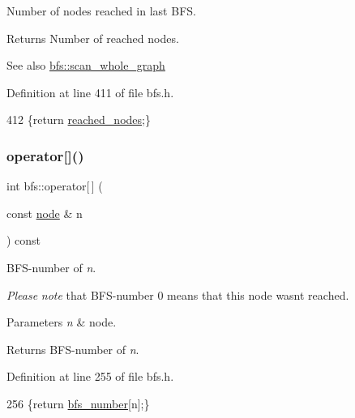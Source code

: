 Number of nodes reached in last B\+FS. 

\begin{DoxyReturn}{Returns}
Number of reached nodes. 
\end{DoxyReturn}
\begin{DoxySeeAlso}{See also}
\mbox{\hyperlink{classbfs_a25fc51b1bfbbdd3afefe0a84c1bd2f6b}{bfs\+::scan\+\_\+whole\+\_\+graph}} 
\end{DoxySeeAlso}


Definition at line 411 of file bfs.\+h.


\begin{DoxyCode}
412     \{\textcolor{keywordflow}{return} \mbox{\hyperlink{classbfs_ac3db80b59d5db049199936445a6c2da8}{reached\_nodes}};\}
\end{DoxyCode}
\mbox{\label{classbfs_addc2a3d0a275007455d22f6b76830e66}} 
\subsubsection{\texorpdfstring{operator[]()}{operator[]()}}
{\footnotesize\ttfamily int bfs\+::operator\mbox{[}$\,$\mbox{]} (\begin{DoxyParamCaption}\item[{const \mbox{\hyperlink{classnode}{node}} \&}]{n }\end{DoxyParamCaption}) const\hspace{0.3cm}{\ttfamily [inline]}}



B\+F\+S-\/number of {\itshape n}. 

{\itshape Please} {\itshape note} that B\+F\+S-\/number 0 means that this node wasn\textquotesingle{}t reached.


\begin{DoxyParams}{Parameters}
{\em n} & node. \\
\hline
\end{DoxyParams}
\begin{DoxyReturn}{Returns}
B\+F\+S-\/number of {\itshape n}. 
\end{DoxyReturn}


Definition at line 255 of file bfs.\+h.


\begin{DoxyCode}
256     \{\textcolor{keywordflow}{return} \mbox{\hyperlink{classbfs_a59d0c5c5ad2715776b20b1aec03dbc3a}{bfs\_number}}[n];\}
\end{DoxyCode}
\mbox{\label{classbfs_a09c7e35a4c20a24f1a54d63a0a9319a5}} 

